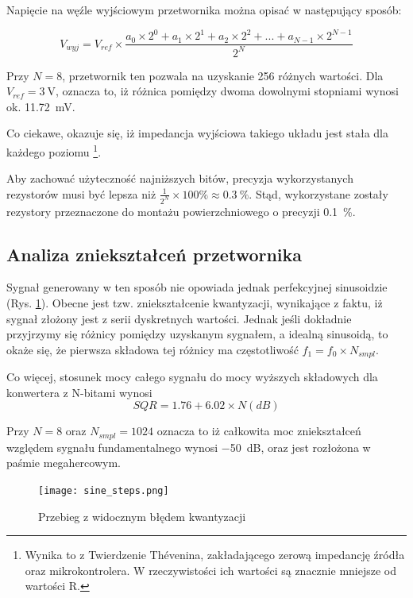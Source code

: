 \documentclass[12pt, a4paper]{article}
\begin{document}
Napięcie na węźle wyjściowym przetwornika można opisać w następujący sposób:

\[
	V_{wyj}=V_{ref} \times \frac{a_0 \times 2^0 + a_1 \times 2^1 + a_2 \times 2^2 + ... + a_{N - 1} \times 2^{N- 1}}{2^N}
\]

Przy $N=8$, przetwornik ten pozwala na uzyskanie 256 różnych wartości. Dla $V_{ref}=\qty{3}{\volt}$,
oznacza to, iż różnica pomiędzy dwoma dowolnymi stopniami wynosi ok. \qty{11,72}{\mV}.

Co ciekawe, okazuje się, iż impedancja wyjściowa takiego układu jest stała dla każdego poziomu
\footnote{
	Wynika to z Twierdzenie Thévenina, zakładającego zerową impedancję źródła oraz mikrokontrolera. 
	W rzeczywistości ich wartości są znacznie mniejsze od wartości R.
}.

Aby zachować użyteczność najniższych bitów, precyzja wykorzystanych rezystorów musi być lepsza niż
$\frac{1}{2^N} \times 100\unit{\percent} \approx \qty{0,3}{\%}$. Stąd, wykorzystane zostały
rezystory przeznaczone do montażu powierzchniowego o precyzji \qty{0,1}{\%}.

\subsection{Analiza zniekształceń przetwornika}

Sygnał generowany w ten sposób nie opowiada jednak perfekcyjnej sinusoidzie (Rys. \ref{fig:sine-stepped}).
Obecne jest tzw. zniekształcenie kwantyzacji, wynikające z faktu, iż sygnał złożony jest 
z serii dyskretnych wartości. Jednak jeśli dokładnie przyjrzymy się różnicy pomiędzy uzyskanym sygnałem,
a idealną sinusoidą, to okaże się, że pierwsza składowa tej różnicy ma częstotliwość $f_1 = f_0 \times N_{smpl}$.

Co więcej, stosunek mocy całego sygnału do mocy wyższych składowych dla konwertera z N-bitami wynosi \cite{analog-dac-noise}
\begin{equation}
	SQR = 1.76 + 6.02 \times N (dB)
\end{equation}

Przy $N=8$ oraz $N_{smpl}=1024$ oznacza to iż całkowita moc zniekształceń względem sygnału fundamentalnego wynosi \qty{-50}{\dB}, 
oraz jest rozłożona w paśmie megahercowym.

\begin{figure}[h]
	\centering
	\texttt{[image: sine\_steps.png]}
	\caption{Przebieg z widocznym błędem kwantyzacji}
	\label{fig:sine-stepped}
\end{figure}
\end{document}
